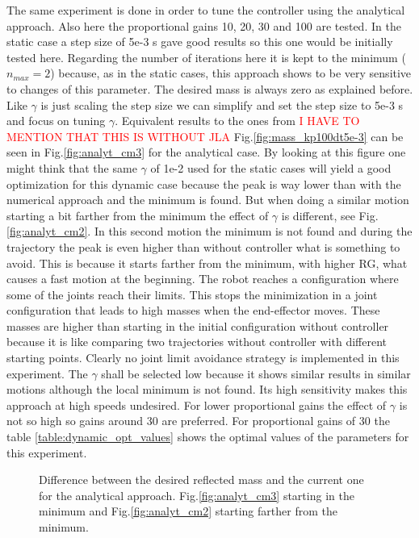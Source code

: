 The same experiment is done in order to tune the controller using the analytical approach.
Also here the proportional gains 10, 20, 30 and 100 are tested. In the static case a step size of 5e-3 s gave good results so this one would be initially tested here. Regarding the number of iterations here it is kept to the minimum ($n_{max}=2$) because, as in the static cases, this approach shows to be very sensitive to changes of this parameter.
The desired mass is always zero as explained before. Like $\gamma$ is just scaling the step size we can simplify and set the step size to 5e-3 s and focus on tuning $\gamma$. Equivalent results to the ones from \textcolor{red}{I HAVE TO MENTION THAT THIS IS WITHOUT JLA} Fig.\ref{fig:mass_kp100dt5e-3} can be seen in Fig.\ref{fig:analyt_cm3} for the analytical case. By looking at this figure one might think that the same $\gamma$ of 1e-2 used for the static cases will yield a good optimization for this dynamic case because the peak is way lower than with the numerical approach and the minimum is found. But when doing a similar motion starting a bit farther from the minimum the effect of $\gamma$ is different, see Fig.\ref{fig:analyt_cm2}. In this second motion the minimum is not found and during the trajectory the peak is even higher than without controller what is something to avoid. This is because it starts farther from the minimum, with higher RG, what causes a fast motion at the beginning. The robot reaches a configuration where some of the joints reach their limits. This stops the minimization in a joint configuration that leads to high masses when the end-effector moves. These masses are higher than starting in the initial configuration without controller because it is like comparing two trajectories without controller with different starting points. Clearly no joint limit avoidance strategy is implemented in this experiment.
The $\gamma$ shall be selected low because it shows similar results in similar motions although the local minimum is not found. Its high sensitivity makes this approach at high speeds undesired.
For lower proportional gains the effect of $\gamma$ is not so high so gains around 30 are preferred.
For proportional gains of 30 the table \ref{table:dynamic_opt_values} shows the optimal values of the parameters for this experiment.



\begin{figure}[!htp!]
	\centering	
	 	 	 	
	\caption{Difference between the desired reflected mass and the current one for the analytical approach.  Fig.\ref{fig:analyt_cm3} starting in the minimum and Fig.\ref{fig:analyt_cm2} starting farther from the minimum.}
	\label{fig:analyt_cm2and3}
\end{figure}





